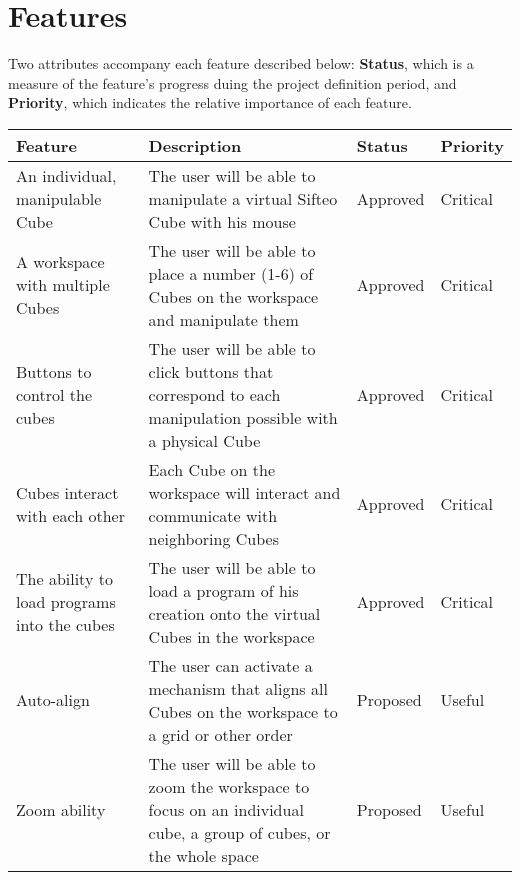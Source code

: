 \documentclass[12pt]{article}
\begin{document}
\section{Features}
Two attributes accompany each feature described below: \textbf{Status}, which is a measure of the feature's progress duing the project definition period, and \textbf{Priority}, which indicates the relative importance of each feature.
    \begin{table}[h]
      \begin{tabular}{p{1.5in} | p{1.75in} | p{1in} | p{1in}}
        \textbf{Feature} & \textbf{Description} & \textbf{Status} & \textbf{Priority} \\ \hline

        An individual, manipulable Cube &
        The user will be able to manipulate a virtual Sifteo Cube with his mouse &
        Approved &
        Critical \\ \hline

        A workspace with multiple Cubes &
        The user will be able to place a number (1-6) of Cubes on the workspace and manipulate them &
        Approved &
        Critical \\ \hline

        Buttons to control the cubes &
        The user will be able to click buttons that correspond to each manipulation possible with a physical Cube &
        Approved &
        Critical \\ \hline

        Cubes interact with each other &
        Each Cube on the workspace will interact and communicate with neighboring Cubes &
        Approved &
        Critical \\ \hline

        The ability to load programs into the cubes &
        The user will be able to load a program of his creation onto the virtual Cubes in the workspace &
        Approved &
        Critical \\ \hline

        Auto-align &
        The user can activate a mechanism that aligns all Cubes on the workspace to a grid or other order &
        Proposed &
        Useful \\ \hline

        Zoom ability &
        The user will be able to zoom the workspace to focus on an individual cube, a group of cubes, or the whole space &
        Proposed &
        Useful
      \end{tabular}
    \end{table}
\end{document}
